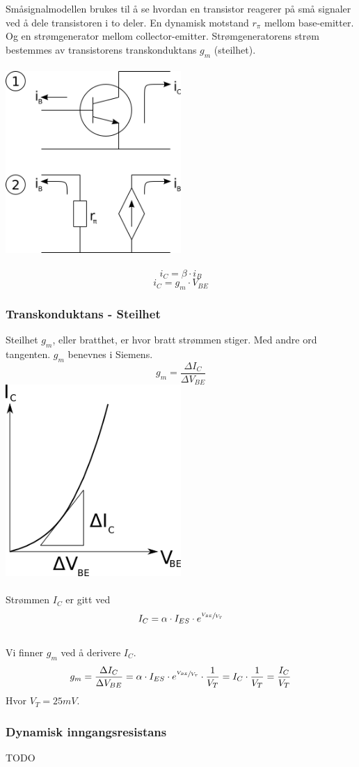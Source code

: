 Småsignalmodellen brukes til å se hvordan en transistor
reagerer på små signaler ved å dele transistoren i to deler.
En dynamisk motstand $r_\pi$ mellom base-emitter.
Og en strømgenerator mellom collector-emitter.
Strømgeneratorens strøm bestemmes av transistorens
transkonduktans $g_m$ (steilhet).
\\\\
\includegraphics[width=0.5\textwidth]{./img/smasignal}
\\\\
$$i_C = \beta \cdot i_B$$
$$i_C = g_m \cdot V_{BE}$$



\subsubsection{Transkonduktans - Steilhet}
Steilhet $g_m$, eller bratthet, er hvor bratt strømmen stiger.
Med andre ord tangenten.
$g_m$ benevnes i Siemens.
$$g_m = \frac{\Delta I_C}{\Delta V_{BE}}$$
\includegraphics[width=0.5\textwidth]{./img/steilhet}
\\\\
Strømmen $I_C$ er gitt ved
$$I_C = \alpha \cdot I_{ES} \cdot e^{\sfrac{V_{BE}}{V_T}}$$
\\
Vi finner $g_m$ ved å derivere $I_C$.
$$g_m = \frac{\Delta I_C}{\Delta V_{BE}}
= \alpha \cdot I_{ES} \cdot e^{\sfrac{V_{BE}}{V_T}} \cdot \frac{1}{V_T}
= I_C \cdot \frac{1}{V_T} = \frac{I_C}{V_T}$$
Hvor $V_T = 25mV$.



\subsubsection{Dynamisk inngangsresistans}
TODO
